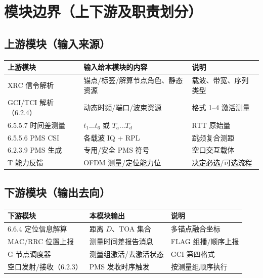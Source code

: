 \documentclass[11pt,a4paper]{ctexart}
\begin{document}
\section{模块边界（上下游及职责划分）}

\subsection{上游模块（输入来源）}

\begin{table}[h]
\centering
\small
\begin{tabular}{p{4.2cm}p{4.5cm}p{5.5cm}}
\toprule
\textbf{上游模块} & \textbf{输入给本模块的内容} & \textbf{说明} \\
\midrule
XRC 信令解析 & 锚点/标签/解算节点角色、静态资源 & 载波、带宽、序列类型 \\
GCI/TCI 解析（6.2.4） & 动态时频/端口/波束资源 & 格式 1--4 激活测量 \\
6.5.5.7 时间差测量 & $t_1\ldots t_6$ 或 $T_a\ldots T_d$ & RTT 原始量 \\
6.5.5.6 PMS CSI & 各载波 IQ + RPL & 跳频复合测距 \\
6.2.3.9 PMS 生成 & 专用/安全 PMS 符号 & 空口交互载体 \\
T 能力反馈 & OFDM 测量/定位能力位 & 决定必选/可选流程 \\
\bottomrule
\end{tabular}
\end{table}

\subsection{下游模块（输出去向）}

\begin{table}[h]
\centering
\small
\begin{tabular}{p{4.2cm}p{4.5cm}p{5.5cm}}
\toprule
\textbf{下游模块} & \textbf{本模块输出} & \textbf{说明} \\
\midrule
6.6.4 定位信息解算 & 距离 $D$、TOA 集合 & 多锚点融合坐标 \\
MAC/RRC 位置上报 & 测量时间差报告消息 & FLAG 组播/顺序上报 \\
G 节点调度器 & 测量组激活/去激活状态 & GCI 第四格式 \\
空口发射/接收（6.2.3） & PMS 发收时序触发 & 按测量组顺序执行 \\
\bottomrule
\end{tabular}
\end{table}
\end{document}
